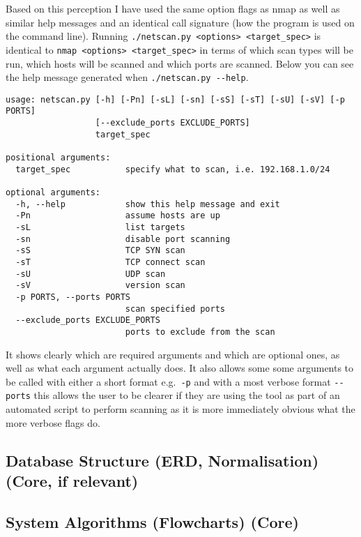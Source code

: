 \documentclass[titlepage]{article}
\begin{document}
Based on this perception I have used the same option flags as nmap as well as similar help messages
and an identical call signature (how the program is used on the command line). Running 
\verb|./netscan.py <options> <target_spec>| is identical to \verb|nmap <options> <target_spec>| in terms
of which scan types will be run, which hosts will be scanned and which ports are scanned. Below you can see
the help message generated when \verb|./netscan.py --help|.
\begin{lstlisting}
usage: netscan.py [-h] [-Pn] [-sL] [-sn] [-sS] [-sT] [-sU] [-sV] [-p PORTS]
                  [--exclude_ports EXCLUDE_PORTS]
                  target_spec

positional arguments:
  target_spec           specify what to scan, i.e. 192.168.1.0/24

optional arguments:
  -h, --help            show this help message and exit
  -Pn                   assume hosts are up
  -sL                   list targets
  -sn                   disable port scanning
  -sS                   TCP SYN scan
  -sT                   TCP connect scan
  -sU                   UDP scan
  -sV                   version scan
  -p PORTS, --ports PORTS
                        scan specified ports
  --exclude_ports EXCLUDE_PORTS
                        ports to exclude from the scan
\end{lstlisting}

It shows clearly which are required arguments and which are optional ones, as well as what
each argument actually does. It also allows some some arguments to be called with either
a short format e.g.\ \verb|-p| and with a most verbose format \verb|--ports| this allows
the user to be clearer if they are using the tool as part of an automated script to perform
scanning as it is more immediately obvious what the more verbose flags do.

\subsection{Database Structure (ERD, Normalisation) (Core, if relevant)}

\textbf{\color{red}{I am fairly sure this is irrelevant to mine?}}

\subsection{System Algorithms (Flowcharts) (Core)}

\textbf{\color{Emerald}{When I have finished the first draft of the text bits I will add pictures / flowcharts}}
\end{document}
